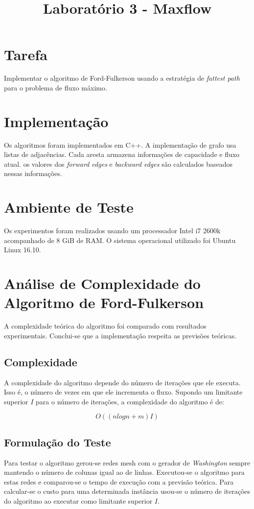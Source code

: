 \documentclass{iiufrgs}
\title{Laboratório 3 - Maxflow}
\author{}{Thiago Bell}
\begin{document}
\maketitle

\setcounter{chapter}{1}

\section{Tarefa}
Implementar o algoritmo de Ford-Fulkerson usando a estratégia de \emph{fattest path} para o problema de fluxo máximo. 

\section{Implementaç\~ao}
Os algoritmos foram implementados em C++. A implementação de grafo usa listas de adjacências. Cada aresta armazena informações de
capacidade e fluxo atual. os valores dos \emph{forward edges} e \emph{backward edges} são calculados baseados nessas informações.

\section{Ambiente de Teste}
Os experimentos foram realizados usando um processador Intel i7 2600k acompanhado de 8 GiB de RAM. 
O sistema operacional utilizado foi Ubuntu Linux 16.10.

\section{Análise de Complexidade do Algoritmo de Ford-Fulkerson}
A complexidade teórica do algoritmo foi comparado com resultados experimentais.
Conclui-se que a implementaç\~ao respeita as previs\~oes teóricas.

\subsection{Complexidade}
A complexidade do algoritmo depende do número de iterações que ele executa. Isso é, o número de vezes em que ele incrementa o fluxo.
Supondo um limitante superior $I$ para o número de iterações, a complexidade do algoritmo é de:

\begin{equation*}
\label{eq:ql}
O((nlogn + m)I)
\end{equation*}

\subsection{Formulação do Teste}
Para testar o algoritmo gerou-se redes mesh com o gerador de \emph{Washington} sempre mantendo o número de colunas igual ao de 
linhas. Executou-se o algoritmo para estas redes e comparou-se o tempo de execução com a previsão teórica. Para calcular-se o custo
para uma determinada instância usou-se o número de iterações do algoritmo ao executar como limitante superior $I$.
\end{document}
